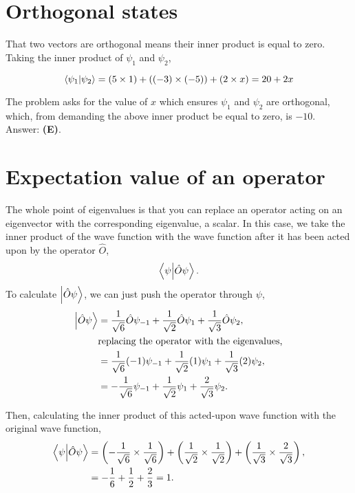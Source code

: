 \documentclass[11pt]{paper}
\newcommand{\answer}[1]{Answer: \textbf{(#1)}.}
\begin{document}
\section{Orthogonal states}
That two vectors are orthogonal means their inner product is equal to zero.  Taking the inner product of $\psi_1$ and $\psi_2$,

\begin{equation}
\bra{\psi_1}\ket{\psi_2} = (5 \times 1) + ((-3) \times (-5)) + (2 \times x) = 20+2x
\end{equation}

The problem asks for the value of $x$ which ensures $\psi_1$ and $\psi_2$ are orthogonal, which, from demanding the above inner product be equal to zero, is $-10$.\\

\answer{E}

\section{Expectation value of an operator}
The whole point of eigenvalues is that you can replace an operator acting on an eigenvector with the corresponding eigenvalue, a scalar.  In this case, we take the inner product of the wave function with the wave function after it has been acted upon by the operator $\hat{O}$,
\begin{equation}
\bra{\psi}\ket{ \hat{O} \psi}.
\end{equation}
To calculate $\ket{\hat{O} \psi}$, we can just push the operator through $\psi$,
\begin{align}
\ket{\hat{O} \psi} &= \frac{1}{\sqrt{6}} \hat{O} \psi_{-1} + \frac{1}{\sqrt{2}} \hat{O} \psi_{1} + \frac{1}{\sqrt{3}} \hat{O} \psi_{2},\\
&\text{replacing the operator with the eigenvalues,}\\
&= \frac{1}{\sqrt{6}} (-1)  \psi_{-1} + \frac{1}{\sqrt{2}} (1)  \psi_{1}+ \frac{1}{\sqrt{3}} (2)  \psi_{2},\\
&= -\frac{1}{\sqrt{6}} \psi_{-1} + \frac{1}{\sqrt{2}}  \psi_{1}+ \frac{2}{\sqrt{3}}\psi_{2}.
\end{align}

Then, calculating the inner product of this acted-upon wave function with the original wave function,
\begin{align}
\bra{\psi}\ket{ \hat{O} \psi} &= \left(-\frac{1}{\sqrt{6}} \times \frac{1}{\sqrt{6}}\right) + \left(\frac{1}{\sqrt{2}}  \times \frac{1}{\sqrt{2}} \right) + \left(\frac{1}{\sqrt{3}} \times \frac{2}{\sqrt{3}}\right),\\
&= -\frac{1}{6} + \frac{1}{2}+ \frac{2}{3} = 1.
\end{align}
\end{document}
